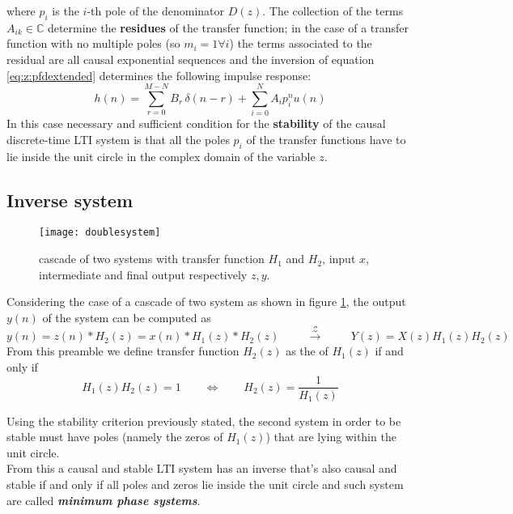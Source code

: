 		where $p_i$ is the $i$-th pole of the denominator $D(z)$. The collection of the terms $A_{ik}\in \mathds C$ determine the \textbf{residues} of the transfer function; in the case of a transfer function with no multiple poles (so $m_i=1 \forall i$) the terms associated to the residual are all causal exponential sequences and the inversion of equation \ref{eq:z:pfdextended} determines the following impulse response:
		\begin{equation}
			h(n) = \sum_{r=0}^{M-N} B_r \, \delta(n-r) + \sum_{i=0}^N A_i p_i^n u(n)
		\end{equation}
		In this case necessary and sufficient condition for the \textbf{stability} of the causal discrete-time LTI system is that all the poles $p_i$ of the transfer functions have to lie inside the unit circle in the complex domain of the variable $z$.
	
	\subsection{Inverse system}
		
		\begin{figure}[bht]
			\centering \texttt{[image: doublesystem]}
			\caption{cascade of two systems with transfer function $H_1$ and $H_2$, input $x$, intermediate and final output respectively $z,y$.} \label{fig:z:cascade}
		\end{figure}
	
		Considering the case of a cascade of two system as shown in figure \ref{fig:z:cascade}, the output $y(n)$ of the system can be computed as
		\[ y(n) = z(n)*H_2(z) = x(n)*H_1(z) * H_2(z) \hspace{1cm} \xrightarrow{\mathcal Z} \hspace{1cm} Y(z) = X(z)H_1(z)H_2(z) \]
		From this preamble we define transfer function $H_2(z)$ as the  of $H_1(z)$ if and only if 
		\begin{equation}
			H_1(z)H_2(z) = 1 \qquad \Leftrightarrow \qquad H_2(z) = \frac{1}{H_1(z)}
		\end{equation}
		
		Using the stability criterion previously stated, the second system in order to be stable must have poles (namely the zeros of $H_1(z)$) that are lying within the unit circle.\\
		From this a causal and stable LTI system has an inverse that's also causal and stable if and only if all poles and zeros lie inside the unit circle and such system are called \textbf{\textit{minimum phase systems}}.
		
